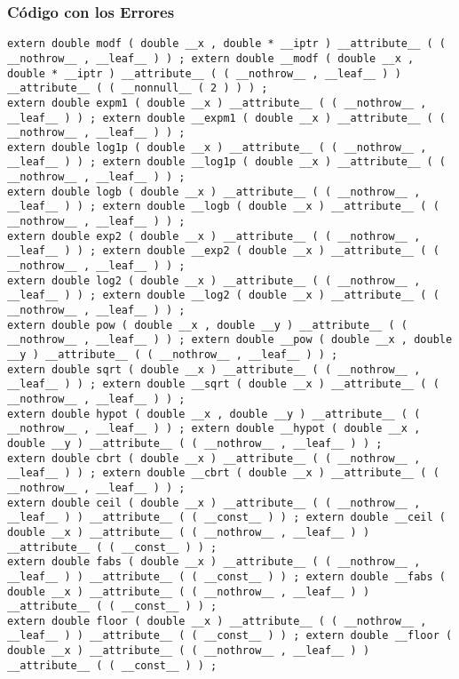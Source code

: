 \documentclass{beamer}
\begin{document}
\begin{frame}[fragile]
\frametitle{C\'odigo con los Errores}
\begin{verbatim}
extern double modf ( double __x , double * __iptr ) __attribute__ ( ( __nothrow__ , __leaf__ ) ) ; extern double __modf ( double __x , double * __iptr ) __attribute__ ( ( __nothrow__ , __leaf__ ) ) __attribute__ ( ( __nonnull__ ( 2 ) ) ) ; 
extern double expm1 ( double __x ) __attribute__ ( ( __nothrow__ , __leaf__ ) ) ; extern double __expm1 ( double __x ) __attribute__ ( ( __nothrow__ , __leaf__ ) ) ; 
extern double log1p ( double __x ) __attribute__ ( ( __nothrow__ , __leaf__ ) ) ; extern double __log1p ( double __x ) __attribute__ ( ( __nothrow__ , __leaf__ ) ) ; 
extern double logb ( double __x ) __attribute__ ( ( __nothrow__ , __leaf__ ) ) ; extern double __logb ( double __x ) __attribute__ ( ( __nothrow__ , __leaf__ ) ) ; 
extern double exp2 ( double __x ) __attribute__ ( ( __nothrow__ , __leaf__ ) ) ; extern double __exp2 ( double __x ) __attribute__ ( ( __nothrow__ , __leaf__ ) ) ; 
extern double log2 ( double __x ) __attribute__ ( ( __nothrow__ , __leaf__ ) ) ; extern double __log2 ( double __x ) __attribute__ ( ( __nothrow__ , __leaf__ ) ) ; 
extern double pow ( double __x , double __y ) __attribute__ ( ( __nothrow__ , __leaf__ ) ) ; extern double __pow ( double __x , double __y ) __attribute__ ( ( __nothrow__ , __leaf__ ) ) ; 
extern double sqrt ( double __x ) __attribute__ ( ( __nothrow__ , __leaf__ ) ) ; extern double __sqrt ( double __x ) __attribute__ ( ( __nothrow__ , __leaf__ ) ) ; 
extern double hypot ( double __x , double __y ) __attribute__ ( ( __nothrow__ , __leaf__ ) ) ; extern double __hypot ( double __x , double __y ) __attribute__ ( ( __nothrow__ , __leaf__ ) ) ; 
extern double cbrt ( double __x ) __attribute__ ( ( __nothrow__ , __leaf__ ) ) ; extern double __cbrt ( double __x ) __attribute__ ( ( __nothrow__ , __leaf__ ) ) ; 
extern double ceil ( double __x ) __attribute__ ( ( __nothrow__ , __leaf__ ) ) __attribute__ ( ( __const__ ) ) ; extern double __ceil ( double __x ) __attribute__ ( ( __nothrow__ , __leaf__ ) ) __attribute__ ( ( __const__ ) ) ; 
extern double fabs ( double __x ) __attribute__ ( ( __nothrow__ , __leaf__ ) ) __attribute__ ( ( __const__ ) ) ; extern double __fabs ( double __x ) __attribute__ ( ( __nothrow__ , __leaf__ ) ) __attribute__ ( ( __const__ ) ) ; 
extern double floor ( double __x ) __attribute__ ( ( __nothrow__ , __leaf__ ) ) __attribute__ ( ( __const__ ) ) ; extern double __floor ( double __x ) __attribute__ ( ( __nothrow__ , __leaf__ ) ) __attribute__ ( ( __const__ ) ) ; 
\end{verbatim}
\end{frame}
\end{document}
